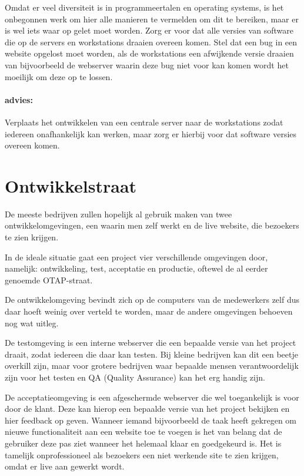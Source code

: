 Omdat er veel diversiteit is in programmeertalen en operating systems, is het onbegonnen werk om hier alle manieren te vermelden om dit te bereiken, maar er is wel iets waar op gelet moet worden. Zorg er voor dat alle versies van software die op de servers en workstations draaien overeen komen. Stel dat een bug in een website opgelost moet worden, als de workstations een afwijkende versie draaien van bijvoorbeeld de webserver waarin deze bug niet voor kan komen wordt het moeilijk om deze op te lossen.

\paragraph{advies:} Verplaats het ontwikkelen van een centrale server naar de workstations zodat iedereen onafhankelijk kan werken, maar zorg er hierbij voor dat software versies overeen komen.

\section{Ontwikkelstraat}

De meeste bedrijven zullen hopelijk al gebruik maken van twee ontwikkelomgevingen, een waarin men zelf werkt en de live website, die bezoekers te zien krijgen.

In de ideale situatie gaat een project vier verschillende omgevingen door, namelijk: ontwikkeling, test, acceptatie en productie, oftewel de al eerder genoemde OTAP-straat. 

De ontwikkelomgeving bevindt zich op de computers van de medewerkers zelf dus daar hoeft weinig over verteld te worden, maar de andere omgevingen behoeven nog wat uitleg.

De testomgeving is een interne webserver die een bepaalde versie van het project draait, zodat iedereen die daar kan testen. Bij kleine bedrijven kan dit een beetje overkill zijn, maar voor grotere bedrijven waar bepaalde mensen verantwoordelijk zijn voor het testen en QA (Quality Assurance) kan het erg handig zijn.

De acceptatieomgeving is een afgeschermde webserver die wel toegankelijk is voor door de klant. Deze kan hierop een bepaalde versie van het project bekijken en hier feedback op geven. Wanneer iemand bijvoorbeeld de taak heeft gekregen om nieuwe functionaliteit aan een website toe te voegen is het van belang dat de gebruiker deze pas ziet wanneer het helemaal klaar en goedgekeurd is. Het is tamelijk onprofessioneel als bezoekers een niet werkende site te zien krijgen, omdat er live aan gewerkt wordt.

